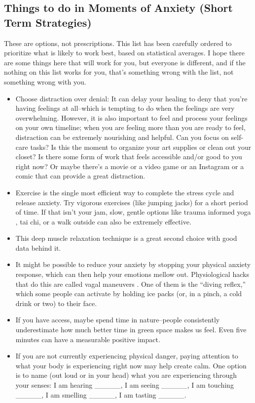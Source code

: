 \documentclass[12pt,letterpaper]{book}
\begin{document}
\subsection{Things to do in Moments of Anxiety (Short Term Strategies)}
\label{sec:shorttermanxiety}
These are options, not prescriptions. This list has been carefully ordered to prioritize what is likely to work best, based on statistical averages. I hope there are some things here that will work for you, but everyone is different, and if the nothing on this list works for you, that's something wrong with the list, not something wrong with you.
\begin{itemize}
    \item Choose distraction over denial: It can delay your healing to deny that you're having feelings at all--which is tempting to do when the feelings are very overwhelming. However, it is also important to feel and process your feelings on your own timeline; when you are feeling more than you are ready to feel, distraction can be extremely nourishing and helpful. Can you focus on self-care tasks? Is this the moment to organize your art supplies or clean out your closet? Is there some form of work that feels accessible and/or good to you right now? Or maybe there's a movie or a video game or an Instagram or a comic that can provide a great distraction.
    \item Exercise is the single most efficient way to complete the stress cycle and release anxiety. Try vigorous exercises (like jumping jacks) for a short period of time. If that isn't your jam, slow, gentle options like trauma informed yoga \cite{gesselYoga}, tai chi, or a walk outside can also be extremely effective.
    \item This deep muscle relaxation technique \cite{michiganProgressive} is a great second choice with good data behind it.
    \item It might be possible to reduce your anxiety by stopping your physical anxiety response, which can then help your emotions mellow out. Physiological hacks that do this are called vagal maneuvers \cite{dilonardoValsalva}. One of them is the “diving reflex,” which some people can activate by holding ice packs (or, in a pinch, a cold drink or two) to their face.
    \item If you have access, maybe spend time in nature--people consistently underestimate how much better time in green space makes us feel. Even five minutes can have a measurable positive impact.
    \item If you are not currently experiencing physical danger, paying attention to what your body is experiencing right now may help create calm. One option is to name (out loud or in your head) what you are experiencing through your senses: I am hearing \_\_\_\_\_, I am seeing \_\_\_\_\_, I am touching \_\_\_\_\_, I am smelling \_\_\_\_\_, I am tasting \_\_\_\_\_.

\end{itemize}
\end{document}
